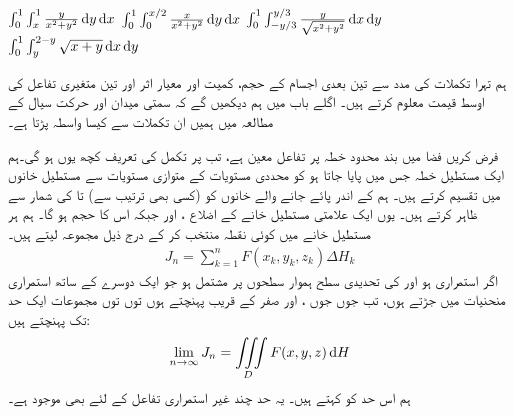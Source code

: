 $\int_0^1\int_x^1\frac{y}{x^2+y^2}\dif y\dif x$
$\int_{0}^{1}\int_{0}^{x/2}\frac{x}{x^2+y^2}\dif y\dif x$
$\int_{0}^{1}\int_{-y/3}^{y/3}\frac{y}{\sqrt{x^2+y^2}}\dif x\dif y$
$\int_{0}^{1}\int_{y}^{2-y}\sqrt{x+y}\dif x\dif y$


ہم تہرا تکملات کی مدد سے تین بعدی اجسام کے حجم، کمیت اور معیار اثر  اور تین متغیری تفاعل کی اوسط قیمت معلوم کرتے ہیں۔ اگلے باب میں ہم دیکھیں گے کہ سمتی میدان   اور  حرکت سیال  کے مطالعہ میں ہمیں ان تکملات سے کیسا واسطہ پڑتا ہے۔

فرض کریں فضا میں بند محدود   خطہ   پر تفاعل  معین ہے، تب  پر تکمل   کی تعریف کچھ یوں ہو گی۔ہم ایک مستطیل خطہ  جس میں  پایا جاتا ہو کو محددی مستویات کے متوازی  مستویات  سے مستطیل خانوں میں تقسیم کرتے ہیں۔ ہم  کے اندر پائے جانے والے  خانوں کو  (کسی بھی ترتیب سے)  تا  کی  شمار سے ظاہر  کرتے ہیں۔   یوں ایک علامتی مستطیل خانے کے اضلاع ،  اور  جبکہ اس کا حجم  ہو گا۔ ہم ہر مستطیل خانے میں کوئی نقطہ  منتخب کر کے درج ذیل مجموعہ  لیتے  ہیں۔
\begin{align}\label{مساوات_بالکثرت_تہرا_مجموعہ_الف}
J_n=\sum_{k=1}^{n} F(x_k,y_k,z_k)\Delta H_k
\end{align}
اگر  استمراری ہو اور  کی تحدیدی سطح ہموار سطحوں پر مشتمل ہو جو ایک دوسرے کے ساتھ استمراری منحنیات میں جڑتے ہوں، تب جوں جوں ،  اور  صفر کے قریب پہنچتے ہوں  توں توں  مجموعات    ایک حد تک پہنچتے ہیں:
\begin{align}
\lim_{n\to \infty}J_n=\iiint\limits_D F(x,y,z)\dif H
\end{align} 
ہم اس حد کو کہتے ہیں۔ یہ حد چند غیر استمراری تفاعل کے لئے بھی موجود ہے۔

